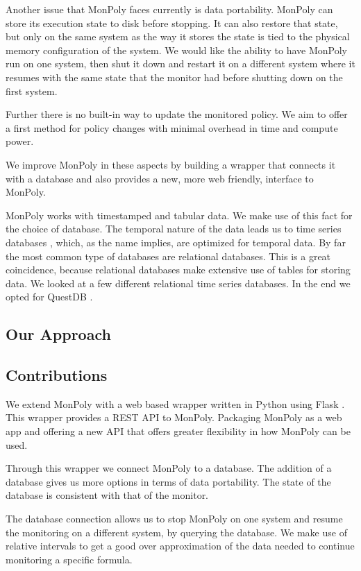 Another issue that MonPoly faces currently is data portability.
MonPoly can store its execution state to disk before stopping.
It can also restore that state, but only on the same system as the way it stores the state is tied to the physical memory configuration of the system.
We would like the ability to have MonPoly run on one system, then shut it down and restart it on a different system where it resumes with the same state that the monitor had before shutting down on the first system.

Further there is no built-in way to update the monitored policy.
We aim to offer a first method for policy changes with minimal overhead in time and compute power.

We improve MonPoly in these aspects by building a wrapper that connects it with a database and also provides a new, more web friendly, interface to MonPoly.


MonPoly works with timestamped and tabular data.
We make use of this fact for the choice of database.
The temporal nature of the data leads us to time series databases \cite{}, which, as the name implies, are optimized for temporal data.
By far the most common type of databases are relational databases.
This is a great coincidence, because relational databases make extensive use of tables for storing data.
We looked at a few different relational time series databases.
In the end we opted for QuestDB \cite{questdb}.

\subsection{Our Approach}

\subsection{Contributions}
We extend MonPoly with a web based wrapper written in Python using Flask \cite{Flask}.
This wrapper provides a REST API \cite{Fielding2000} to MonPoly.
Packaging MonPoly as a web app and offering a new API that offers greater flexibility in how MonPoly can be used.

Through this wrapper we connect MonPoly to a database.
The addition of a database gives us more options in terms of data portability.
The state of the database is consistent with that of the monitor.

The database connection allows us to stop MonPoly on one system and resume the monitoring on a different system, by querying the database.
We make use of relative intervals \cite{Basin2016} to get a good over approximation of the data needed to continue monitoring a specific formula.

